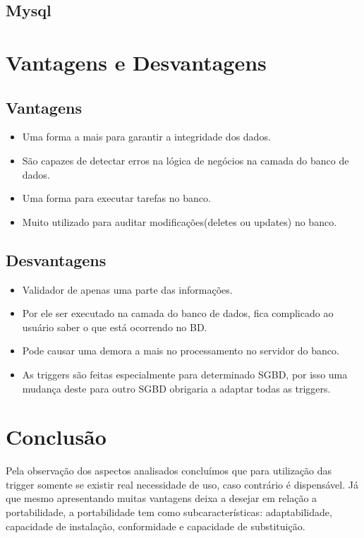 \documentclass[12pt,a4paper]{article}
\begin{document}


\subsection{Mysql}



\section{Vantagens e Desvantagens}
\subsection{Vantagens}
\begin{itemize}
\item Uma forma a mais para garantir a integridade dos dados.
\item São capazes de detectar erros na lógica de negócios na camada do banco de dados.
\item Uma forma para executar tarefas no banco.
\item Muito utilizado para auditar modificações(deletes ou updates) no banco.
\end{itemize}

\subsection{Desvantagens}
\begin{itemize}
\item Validador de apenas uma parte das informações.
\item Por ele ser executado na camada do banco de dados, fica complicado ao usuário saber o que está
ocorrendo no BD.
\item Pode causar uma demora a mais no processamento no servidor do banco.
\item As triggers são feitas especialmente para determinado SGBD, por isso uma mudança deste para outro SGBD obrigaria a adaptar todas as triggers.
\end{itemize}

\section{Conclusão}

Pela observação dos aspectos analisados concluímos que para utilização das trigger somente se existir real necessidade de uso, caso contrário é dispensável.
Já que mesmo apresentando muitas vantagens deixa a desejar em relação a portabilidade, a portabilidade tem como subcaracterísticas: adaptabilidade, capacidade de instalação, conformidade e capacidade de substituição.  
\end{document}
